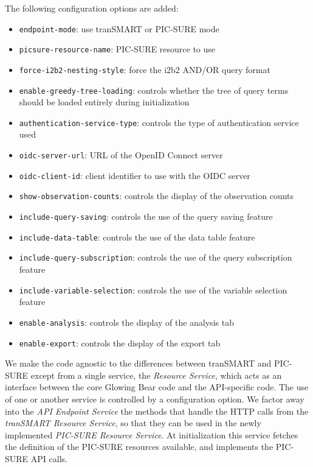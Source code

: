 The following configuration options are added:
\begin{itemize}
    \setlength\itemsep{0em}

    \item \verb|endpoint-mode|: use tranSMART or PIC-SURE mode
    \item \verb|picsure-resource-name|: PIC-SURE resource to use
    \item \verb|force-i2b2-nesting-style|: force the i2b2 AND/OR query format
    \item \verb|enable-greedy-tree-loading|: controls whether the tree of query terms should be loaded entirely during initialization \\

    \item \verb|authentication-service-type|: controls the type of authentication service used
    \item \verb|oidc-server-url|: URL of the OpenID Connect server
    \item \verb|oidc-client-id|: client identifier to use with the OIDC server \\
    
    \item \verb|show-observation-counts|: controls the display of the observation counts
    \item \verb|include-query-saving|: controls the use of the query saving feature
    \item \verb|include-data-table|: controls the use of the data table feature
    \item \verb|include-query-subscription|: controls the use of the query subscription feature
    \item \verb|include-variable-selection|: controls the use of the variable selection feature
    \item \verb|enable-analysis|: controls the display of the analysis tab
    \item \verb|enable-export|: controls the display of the export tab

\end{itemize}

We make the code agnostic to the differences between tranSMART and PIC-SURE except from a single service, the \emph{Resource Service}, which acts as an interface between the core Glowing Bear code and the API-specific code.
The use of one or another service is controlled by a configuration option.
We factor away into the \emph{API Endpoint Service} the methods that handle the HTTP calls from the \emph{tranSMART Resource Service}, so that they can be used in the newly implemented \emph{PIC-SURE Resource Service}.
At initialization this service fetches the definition of the PIC-SURE resources available, and implements the PIC-SURE API calls.

